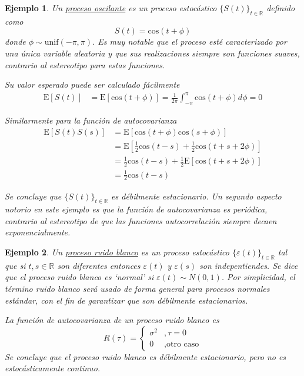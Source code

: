 \documentclass[12pt,letterpaper]{book}
\newtheorem{ejemplo}{Ejemplo}[chapter]
\newcommand{\R}{\mathbb{R}}
\newcommand{\COS}[1]{\mathrm{cos}\left( #1 \right)}
\newcommand{\E}[1]{\mathrm{E}\left[ #1 \right]}
\begin{document}
\begin{ejemplo}
Un \underline{proceso oscilante} es un proceso estocástico $\{ S(t)\}_{t\in\R}$ definido como
\begin{equation}
S(t) = \COS{t + \phi}
\end{equation}
donde $\phi \sim \text{unif}(-\pi,\pi)$.
%
Es muy notable que el proceso esté \textit{caracterizado} por una única variable aleatoria y que sus realizaciones siempre son funciones \textit{suaves}, contrario al estereotipo para estas funciones.

Su valor esperado puede ser calculado fácilmente
\begin{align}
\E{S(t)} &= \E{\COS{t + \phi}} = \frac{1}{2 \pi} \int_{-\pi}^\pi \COS{t + \phi} d\phi = 0
\end{align}

Similarmente para la función de autocovarianza
\begin{align*}
\E{S(t)S(s)} &= 
\E{\COS{t + \phi}\COS{s + \phi}} \\
&=
\E{\frac{1}{2} \COS{t-s} + \frac{1}{2}\COS{t+s+2\phi}} \\
&=
\frac{1}{2} \COS{t-s} + \frac{1}{2} \E{\COS{t+s+2\phi}} \\
&= \frac{1}{2} \COS{t-s}
\end{align*}

Se concluye que $\{ S(t)\}_{t\in\R}$ es débilmente estacionario.
%
Un segundo aspecto notorio en este ejemplo es que la función de autocovarianza es periódica, contrario al estereotipo de que las funciones autocorrelación siempre decaen exponencialmente.
\end{ejemplo}

\begin{ejemplo}
Un \underline{proceso ruido blanco} es un proceso estocástico $\{ \varepsilon(t)\}_{t\in\R}$ tal que si $t, s\in \R$ son diferentes entonces $\varepsilon(t)$ y $\varepsilon(s)$ son indepentiendes.
%
Se dice que el proceso ruido blanco es `normal' si $\varepsilon(t) \sim N(0,1)$.
%
Por simplicidad, el término ruido blanco será usado de forma general para procesos normales estándar, con el fin de garantizar que son débilmente estacionarios.

La función de autocovarianza de un proceso ruido blanco es
\begin{equation}
R(\tau) = \begin{cases}
\sigma^2 &, \tau = 0 \\
0 &, \text{otro caso}
\end{cases}
\end{equation}
Se concluye que el proceso ruido blanco es débilmente estacionario, pero no es estocásticamente continuo.
\end{ejemplo}
\end{document}
